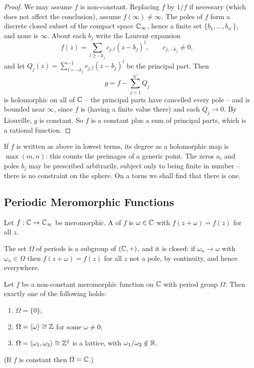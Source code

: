 \documentclass[a4paper]{scrartcl}
\newcommand{\genby}[1]{\langle #1 \rangle}
\newcommand{\Cinf}{\C_\infty}
\begin{document}
\begin{proof}
	We may assume $f$ is non-constant. Replacing $f$ by $1/f$ if necessary (which does not
	affect the conclusion), assume $f(\infty)\neq\infty$. The poles of $f$ form a discrete
	closed subset of the compact space $\Cinf$, hence a finite set $\{b_1,\dots,b_{n'}\}$,
	and none is $\infty$. About each $b_j$ write the Laurent expansion
	$$
	f(z) = \sum_{l \geq -k_j} c_{j,l}(z-b_j)^l, \qquad c_{j,-k_j}\neq 0,
	$$
	and let $Q_j(z) = \sum_{l=-k_j}^{-1}c_{j,l}(z-b_j)^l$ be the principal part. Then
	$$
	g = f - \sum_{j=1}^{n'} Q_j
	$$
	is holomorphic on all of $\mathbb{C}$ -- the principal parts have cancelled every pole -- and
	is bounded near $\infty$, since $f$ is (having a finite value there) and each $Q_j \to 0$.
	By Liouville, $g$ is constant. So $f$ is a constant plus a sum of principal parts, which
	is a rational function.
\end{proof}

\begin{remark}
	If $f$ is written as above in lowest terms, its degree as a holomorphic map is
	$\max(m,n)$: this counts the preimages of a generic point. The zeros $a_i$ and poles
	$b_j$ may be prescribed arbitrarily, subject only to being finite in number -- there is
	no constraint on the sphere. On a torus we shall find that there is one.
\end{remark}

\subsection{Periodic Meromorphic Functions}

\begin{definition}[Period]
	Let $f : \C \to \Cinf$ be meromorphic. A  of $f$ is $\omega \in \mathbb{C}$ with
	$f(z+\omega) = f(z)$ for all $z$.
\end{definition}

The set $\Omega$ of periods is a subgroup of $(\mathbb{C},+)$, and it is closed: if
$\omega_n \to \omega$ with $\omega_n \in \Omega$ then $f(z + \omega) = f(z)$ for all $z$
not a pole, by continuity, and hence everywhere.

\begin{lemma}\label{lem:periodgroups}
	Let $f$ be a non-constant meromorphic function on $\mathbb{C}$ with period group $\Omega$.
	Then exactly one of the following holds:
	\begin{enumerate}[label=(\roman*)]
		\item $\Omega = \{0\}$;
		\item $\Omega = \genby{\omega} \cong \Z$ for some $\omega \neq 0$;
		\item $\Omega = \genby{\omega_1,\omega_2} \cong \Z^2$ is a lattice, with
		$\omega_1/\omega_2 \notin \mathbb{R}$.
	\end{enumerate}
	(If $f$ is constant then $\Omega = \mathbb{C}$.)
\end{lemma}
\end{document}
